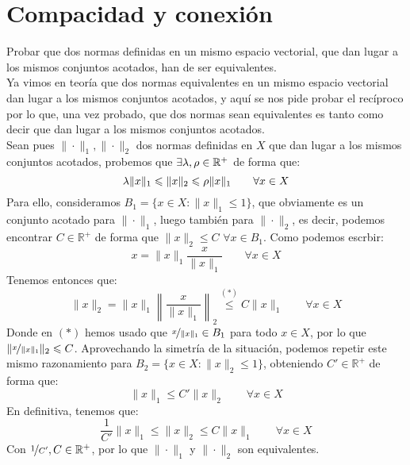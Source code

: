 \section{Compacidad y conexión}


\begin{ejercicio}
Probar que dos normas definidas en un mismo espacio vectorial, que dan lugar a los mismos conjuntos acotados, han de ser equivalentes.\\

\noindent
Ya vimos en teoría que dos normas equivalentes en un mismo espacio vectorial dan lugar a los mismos conjuntos acotados, y aquí se nos pide probar el recíproco por lo que, una vez probado, que dos normas sean equivalentes es tanto como decir que dan lugar a los mismos conjuntos acotados.\\

\noindent
Sean pues $\|\cdot\|_1, \|\cdot\|_2$ dos normas definidas en $X$ que dan lugar a los mismos conjuntos acotados, probemos que $\exists \lm,\rho \in \mathbb{R}^+$ de forma que:
\begin{equation*}
    \lm \|x\|_1 \leq \|x\|_2 \leq \rho \|x\|_1 \qquad \forall x\in X
\end{equation*}
Para ello, consideramos $B_1 = \{x\in X : \|x\|_1 \leq 1\}$, que obviamente es un conjunto acotado para $\|\cdot\|_1$, luego también para $\|\cdot\|_2$, es decir, podemos encontrar $C\in \mathbb{R}^+$ de forma que $\|x\|_2 \leq C$ $\forall x\in B_1$. Como podemos escrbir:
\begin{equation*}
    x = \|x\|_1 \dfrac{x}{\|x\|_1} \qquad \forall x\in X
\end{equation*}
Tenemos entonces que:
\begin{equation*}
    \|x\|_2 = \|x\|_1 \left\|\dfrac{x}{\|x\|_1}\right\|_2 \stackrel{(\ast)}{\leq} C\|x\|_1 \qquad \forall x\in X
\end{equation*}
Donde en $(\ast)$ hemos usado que $\nicefrac{x}{\|x\|_1} \in B_1$ para todo $x\in X$, por lo que $\|\nicefrac{x}{\|x\|_1}\|_2 \leq C$. Aprovechando la simetría de la situación, podemos repetir este mismo razonamiento para $B_2 = \{x\in X : \|x\|_2 \leq 1\}$, obteniendo $C'\in \mathbb{R}^+$ de forma que:
\begin{equation*}
    \|x\|_1 \leq C' \|x\|_2 \qquad \forall x\in X
\end{equation*}
En definitiva, tenemos que:
\begin{equation*}
    \dfrac{1}{C'}\|x\|_1 \leq \|x\|_2 \leq C\|x\|_1 \qquad \forall x\in X
\end{equation*}
Con $\nicefrac{1}{C'},C\in \mathbb{R}^+$, por lo que $\|\cdot\|_1$ y $\|\cdot\|_2$ son equivalentes.
\end{ejercicio}

